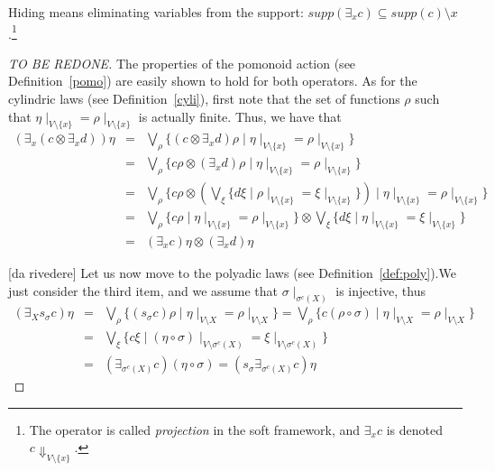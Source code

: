 \documentclass{llncs}
\begin{document}
Hiding means eliminating variables from the support:
$supp(\exists_x c) \subseteq supp({c}) \setminus {x}$.\footnote{The operator
	is called \emph{projection} in the soft framework,
	and $\exists_x c$ is denoted $c\Downarrow_{V\setminus \{x\}}$.}

\begin{proof}[TO BE REDONE]
%
The properties of the pomonoid action (see Definition~\ref{pomo})
are easily shown to hold for both operators. 
%
As for the cylindric laws (see Definition~\ref{cyli}), first note that the set of functions 
$\rho$ such that $\eta\mid_{V \setminus \{x\}} = \rho\mid_{V \setminus \{x\}}$ is actually finite.
Thus, we have that 
\begin{eqnarray*}
(\exists_x (c \otimes \exists_x d)) \eta & = & \bigvee_\rho \{(c \otimes \exists_x d) \rho \mid \eta\mid_{V \setminus \{x\}} = \rho\mid_{V \setminus \{x\}}\}\\
& = & \bigvee_\rho \{c\rho \otimes (\exists_x d) \rho \mid \eta\mid_{V \setminus \{x\}} = \rho\mid_{V \setminus \{x\}}\} \\
& = & \bigvee_\rho \{c\rho \otimes  (\bigvee_\xi \{d \xi \mid \rho\mid_{V \setminus \{x\}} = \xi\mid_{V \setminus \{x\}}\}) \mid \eta\mid_{V \setminus \{x\}} = \rho\mid_{V \setminus \{x\}}\} \\
& = & \bigvee_\rho \{c\rho \mid \eta\mid_{V \setminus \{x\}} = \rho\mid_{V \setminus \{x\}}\} \otimes \bigvee_\xi \{d \xi \mid \eta\mid_{V \setminus \{x\}} = \xi\mid_{V \setminus \{x\}}\} \\
& = & (\exists_x c) \eta \otimes (\exists_x d) \eta
\end{eqnarray*}


[da rivedere]
Let us now move to the polyadic laws (see Definition~\ref{def:poly}).We just consider the third item, 
and we assume that $\sigma \mid_{\sigma^c(X)}$ is injective, thus
\begin{eqnarray*}
(\exists_X s_\sigma c) \eta & = &\bigvee_\rho \{(s_\sigma c) \rho \mid \eta\mid_{V \setminus X} = \rho\mid_{V \setminus X}\} = \bigvee_\rho \{c (\rho \circ \sigma) \mid \eta\mid_{V \setminus X} =   \rho\mid_{V \setminus X}\} \\ 
& = & \bigvee_\xi \{c\xi \mid (\eta \circ \sigma)\mid_{V \setminus \sigma^{c}(X)}  =  \xi\mid_{V \setminus \sigma^{c}(X)}\} \\
& = & (\exists_{\sigma^c(X)} c) (\eta \circ \sigma) = (s_\sigma \exists_{\sigma^c(X)} c) \eta
\end{eqnarray*}


\end{proof}
\end{document}
